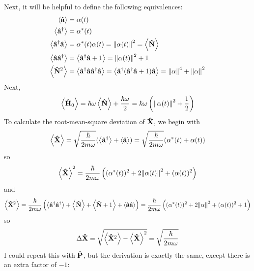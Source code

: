 \documentclass[a4paper,twoside]{article}
\begin{document}
\begin{itemize}
\begin{problem}
            Next, it will be helpful to define the following equivalences:
            \begin{align}
                \ev{ \vu{a}} &= \alpha(t) \\
                \ev{ \vu{a}^\dagger} &= \alpha^*(t) \\
                \ev{ \vu{a}^\dagger \vu{a}} &= \alpha^*(t) \alpha(t) = \norm{\alpha(t)}^2 = \ev{ \vu{N}} \\
                \ev{ \vu{a} \vu{a}^\dagger} &= \ev{ \vu{a}^\dagger \vu{a} + 1} = \norm{\alpha(t)}^2 + 1 \\
                \ev{ \vu{N}^2} &= \ev{ \vu{a}^\dagger \vu{a} \vu{a}^\dagger \vu{a}} = \ev{ \vu{a}^\dagger ( \vu{a}^\dagger \vu{a} + 1) \vu{a}} = \norm{\alpha}^4 + \norm{\alpha}^2
            \end{align}
            Next,
            \begin{equation}
                \ev{ \vu{H}_0} = \hbar \omega \ev{ \vu{N}} + \frac{\hbar \omega}{2} = \hbar \omega \left( \norm{\alpha(t)}^2 + \frac{1}{2} \right)
            \end{equation}
            To calculate the root-mean-square deviation of $ \vu{X} $, we begin with
            \begin{equation}
                \ev{ \vu{X}} = \sqrt{\frac{\hbar}{2 m \omega}} (\ev{ \vu{a}^\dagger} + \ev{ \vu{a}}) = \sqrt{\frac{\hbar}{2m \omega}} (\alpha^*(t) + \alpha(t))
            \end{equation}
            so
            \begin{equation}
                \ev{ \vu{X}}^2 = \frac{\hbar}{2m \omega} \left( (\alpha^*(t))^2 + 2 \norm{\alpha(t)}^2 + (\alpha(t))^2 \right)
            \end{equation}
            and
            \begin{equation}
                \ev{ \vu{X}^2} = \frac{\hbar}{2m \omega} \left( \ev{ \vu{a}^\dagger \vu{a}^\dagger} + \ev{ \vu{N}} + \ev{ \vu{N} + 1} + \ev{ \vu{a} \vu{a}} \right) = \frac{\hbar}{2m \omega} \left( (\alpha^*(t))^2 + 2 \norm{\alpha}^2 + (\alpha(t))^2 + 1 \right)
            \end{equation}
            so
            \begin{equation}
                \Delta \vu{X} = \sqrt{\ev{ \vu{X}^2} - \ev{ \vu{X}}^2} = \sqrt{\frac{\hbar}{2m \omega}}
            \end{equation}
            I could repeat this with $ \vu{P} $, but the derivation is exactly the same, except there is an extra factor of $ -1 $:

\end{problem}
\end{itemize}
\end{document}
